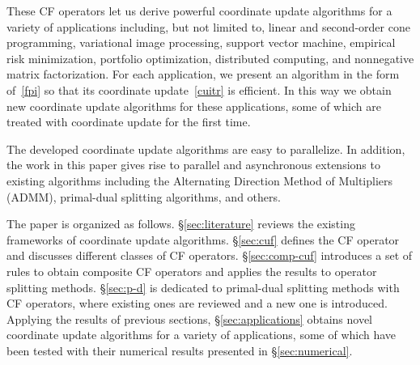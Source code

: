 These CF operators let us derive powerful coordinate update algorithms for a variety of applications including, but not limited to, linear and second-order cone programming, variational image processing, support vector machine, empirical risk minimization, portfolio optimization, distributed computing, and nonnegative matrix factorization. For each application, we present an algorithm in the form of~\eqref{fpi} so that its coordinate update~\eqref{cuitr} is efficient. %
{In this way we obtain new coordinate update algorithms for these applications, some of which  are treated with coordinate update for the first time. %
}



The developed coordinate update algorithms are easy to parallelize. In addition,  the work in this paper  gives rise to parallel and asynchronous extensions to  existing algorithms including the Alternating Direction Method of Multipliers (ADMM), primal-dual splitting algorithms, and others.

The paper is organized as follows. \S\ref{sec:literature} reviews the existing frameworks of coordinate update algorithms. \S\ref{sec:cuf} defines the CF operator and discusses different classes of CF operators. \S\ref{sec:comp-cuf}  introduces a set of rules to obtain composite CF operators and applies the results to operator splitting methods. \S\ref{sec:p-d} is dedicated to  primal-dual splitting methods with CF operators, where existing ones are reviewed and a new one is introduced. Applying the results of previous sections, \S\ref{sec:applications} obtains novel coordinate update algorithms for a variety of applications, some of which have been tested with their numerical results presented in \S\ref{sec:numerical}.

